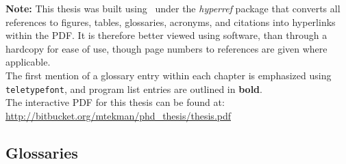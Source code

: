 \documentclass[11pt]{report} %
\begin{document}
\begin{spacing}{1.1}





{\noindent \textbf{Note:} This thesis was built using \LaTeXe\  under the \textit{hyperref} package that converts all references to figures, tables, glossaries, acronyms, and citations into hyperlinks within the PDF. It is therefore better viewed using software, than through a hardcopy for ease of use, though page numbers to references are given where applicable.\\

\noindent
The first mention of a glossary entry within each chapter is emphasized using \texttt{teletypefont}, and program list entries are outlined in \textbf{bold}.\\

\noindent
The interactive PDF for this thesis can be found at:\\
\url{http://bitbucket.org/mtekman/phd_thesis/thesis.pdf}

}


	\begin{spacing}{1.2}

	\end{spacing}

\pagebreak
	\begin{spacing}{1.2}
	\tableofcontents
	\end{spacing}
\end{spacing}

\endgroup





\pagebreak







\begin{spacing}{1}

\addtocounter{chapter}{1}
\pagebreak
{}





\appendix

\pagebreak
\chapter{Glossaries}
\printglossary[type=biol,style=long]
\pagebreak
\printglossary[type=comp,style=long]

\end{spacing}


\end{document}

